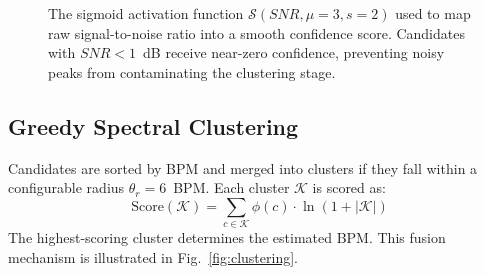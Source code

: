 \documentclass[9pt,technote,twocolumn,compsoc]{article}
\begin{document}
\begin{figure}[t]
\centering
{}
\caption{The sigmoid activation function $\mathcal{S}(SNR, \mu{=}3, s{=}2)$ used to map raw signal-to-noise ratio into a smooth confidence score. Candidates with $SNR < 1$~dB receive near-zero confidence, preventing noisy peaks from contaminating the clustering stage.}
\label{fig:sigmoid}
\end{figure}

\subsection{Greedy Spectral Clustering}
Candidates are sorted by BPM and merged into clusters if they fall within a configurable radius $\theta_r = 6$~BPM. Each cluster $\mathcal{K}$ is scored as:
\begin{equation}
    \text{Score}(\mathcal{K}) = \sum_{c \in \mathcal{K}} \phi(c) \cdot \ln(1 + |\mathcal{K}|)
\end{equation}
The highest-scoring cluster determines the estimated BPM. This fusion mechanism is illustrated in Fig.~\ref{fig:clustering}.
\end{document}
